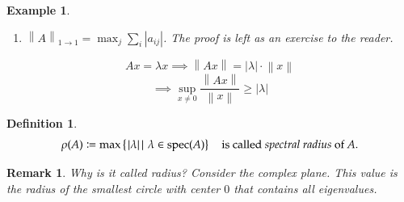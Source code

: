 \documentclass[a4paper]{article}
\newcounter{lecref}[section]
\numberwithin{lecref}{section}
\newtheorem{example}[lecref]{Example}
\newtheorem{definition}[lecref]{Definition}
\newtheorem*{claim}{Claim}
\newtheorem*{Remark}{Remark}
\newcommand{\set}[1]{\left\{#1\right\}}
\newcommand{\setdef}[2]{\left\{\left.#1\,\right|\,#2\right\}}
\newcommand{\norm}[1]{\left\|#1\right\|}
\newcommand{\card}[1]{\left|#1\right|}
\begin{document}
\begin{example}
\begin{enumerate}
\begin{claim}
        $\norm{A}_{\infty\to\infty} = \max_i \sum_j \card{a_{ij}}$
      \end{claim}
      \begin{proof}
        Find vector $\tilde x$ such that $\norm{A\tilde x}_{\infty} = \max_i \sum_j \card{a_{ij}} \cdot \norm{\tilde x}_{\infty}$. Choose $i_0$ such that $\sum_i \card{a_{ij}} = \max!$.
        \[ \tilde x_j = \begin{cases} \frac{\card{a_{i_0 j}}}{a_{i_0 j}} & a_{i_0 j} \neq 0 \\ 0 & \text{else} \end{cases} \]
        $\tilde x_j$ are not all zero, $\card{\tilde x_j} \in \set{0,1} \forall j$.
        \begin{align*}
          (A \cdot \tilde x)_{i_0} &= \sum_j a_{i_0 j} \tilde x_j = \sum_j a_{i_0 j} a_{i_0 j} \frac{\card{a_{i_0 j}}}{a_{i_0 j}} = \sum_j \card{a_{i_0 j}} = \max_i \sum \card{a_{ij}} \\
            &\implies \norm{A \tilde x}_{\infty} \geq \card{(A \tilde x)_{i_0}} = \max_i \sum \card{a_{ij}} \cdot \underbrace{\norm{\tilde x}_{\infty}}_{=1} \\
            &\implies \norm{A}_{\infty\to\infty} \geq \max_i \sum_j \card{a_{ij}} \\
            &\implies \norm{A}_{\infty\to\infty} = \max_i \sum_j \card{a_{ij}} = \max\setdef{\norm{z_i}_1}{z_i \text{ row of } A}
        \end{align*}
      \end{proof}
    \item $\norm{A}_{1 \to 1} = \max_j \sum_i \card{a_{ij}}$.
      The proof is left as an exercise to the reader.
  \end{enumerate}
\end{example}

\[ Ax = \lambda x \implies \norm{Ax} = \card{\lambda} \cdot \norm{x} \]
\[ \implies \sup_{x \neq 0} \frac{\norm{Ax}}{\norm{x}} \geq \card{\lambda} \]

\begin{definition} %
  \[
    \rho(A) \coloneqq \max \setdef{\card{\lambda}}{\lambda \in \operatorname{spec}(A)}
    \quad\text{is called \emph{spectral radius} of $A$.}
  \]
\end{definition}

\begin{Remark}
  Why is it called radius? Consider the complex plane. This value is the radius of the smallest circle with center $0$ that contains all eigenvalues.
\end{Remark}
\end{document}
